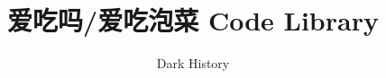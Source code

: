 \documentclass[twoside,a4paper]{article}
\begin{document}
\title{\Huge \bf 爱吃吗/爱吃泡菜 Code Library}
\author{Dark History}
\date{}

\maketitle

\begin{multicols*}{2}
\tableofcontents
\end{multicols*}

\newpage

\columnseprule=0pt

\begin{multicols*}{2}

\end{multicols*}
\end{document}
